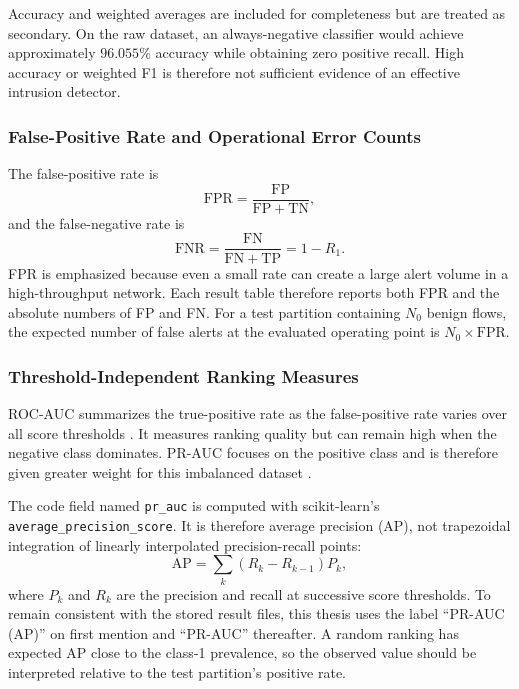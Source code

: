 \documentclass[11pt,fleqn]{report}
\begin{document}
Accuracy and weighted averages are included for completeness but are treated
as secondary. On the raw dataset, an always-negative classifier would achieve
approximately $96.055\%$ accuracy while obtaining zero positive recall. High
accuracy or weighted F1 is therefore not sufficient evidence of an effective
intrusion detector.

\subsubsection{False-Positive Rate and Operational Error Counts}
\label{subsubsec:fpr_metric}

The false-positive rate is
\begin{equation}
    \mathrm{FPR}=\frac{\mathrm{FP}}{\mathrm{FP}+\mathrm{TN}},
    \label{eq:false_positive_rate}
\end{equation}
and the false-negative rate is
\begin{equation}
    \mathrm{FNR}=\frac{\mathrm{FN}}{\mathrm{FN}+\mathrm{TP}}
    =1-R_1.
    \label{eq:false_negative_rate}
\end{equation}
FPR is emphasized because even a small rate can create a large alert volume in
a high-throughput network. Each result table therefore reports both FPR and the
absolute numbers of FP and FN. For a test partition containing $N_0$ benign
flows, the expected number of false alerts at the evaluated operating point is
$N_0\times\mathrm{FPR}$.

\subsubsection{Threshold-Independent Ranking Measures}
\label{subsubsec:ranking_metrics}

ROC-AUC summarizes the true-positive rate as the false-positive rate varies
over all score thresholds \cite{Fawcett2006ROC}. It measures ranking quality
but can remain high when the negative class dominates. PR-AUC focuses on the
positive class and is therefore given greater weight for this imbalanced
dataset \cite{SaitoRehmsmeier2015}.

The code field named \texttt{pr\_auc} is computed with scikit-learn's
\texttt{average\_precision\_score}. It is therefore average precision (AP),
not trapezoidal integration of linearly interpolated precision-recall points:
\begin{equation}
    \mathrm{AP}=\sum_{k}(R_k-R_{k-1})P_k,
    \label{eq:average_precision}
\end{equation}
where $P_k$ and $R_k$ are the precision and recall at successive score
thresholds. To remain consistent with the stored result files, this thesis
uses the label ``PR-AUC (AP)'' on first mention and ``PR-AUC'' thereafter. A
random ranking has expected AP close to the class-1 prevalence, so the observed
value should be interpreted relative to the test partition's positive rate.
\end{document}
